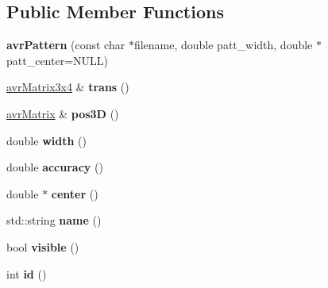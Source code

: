 \subsection*{Public Member Functions}
\begin{DoxyCompactItemize}
\item 
\hypertarget{classavr_pattern_a05f2998048e17c4c0c9aad6f602f11b1}{{\bfseries avr\-Pattern} (const char $\ast$filename, double patt\-\_\-width, double $\ast$patt\-\_\-center=N\-U\-L\-L)}\label{classavr_pattern_a05f2998048e17c4c0c9aad6f602f11b1}

\item 
\hypertarget{classavr_pattern_acbc53b3ae2caa39e890db118045e09f2}{\hyperlink{classavr_matrix3x4}{avr\-Matrix3x4} \& {\bfseries trans} ()}\label{classavr_pattern_acbc53b3ae2caa39e890db118045e09f2}

\item 
\hypertarget{classavr_pattern_affbc11f7ae1f22c9a9fefb855bd6e5b4}{\hyperlink{classavr_matrix}{avr\-Matrix} \& {\bfseries pos3\-D} ()}\label{classavr_pattern_affbc11f7ae1f22c9a9fefb855bd6e5b4}

\item 
\hypertarget{classavr_pattern_acfa3004188b0e188856d99e16b845009}{double {\bfseries width} ()}\label{classavr_pattern_acfa3004188b0e188856d99e16b845009}

\item 
\hypertarget{classavr_pattern_a212a6fc4a9acab9ae06a5fcab82b9c0d}{double {\bfseries accuracy} ()}\label{classavr_pattern_a212a6fc4a9acab9ae06a5fcab82b9c0d}

\item 
\hypertarget{classavr_pattern_aead37a67a2a0ff500b071bd9bafa7c15}{double $\ast$ {\bfseries center} ()}\label{classavr_pattern_aead37a67a2a0ff500b071bd9bafa7c15}

\item 
\hypertarget{classavr_pattern_ab038de2d8ebc3633cd5bbd55d18298a1}{std\-::string {\bfseries name} ()}\label{classavr_pattern_ab038de2d8ebc3633cd5bbd55d18298a1}

\item 
\hypertarget{classavr_pattern_afd677bd736475b0975371795a7bb0209}{bool {\bfseries visible} ()}\label{classavr_pattern_afd677bd736475b0975371795a7bb0209}

\item 
\hypertarget{classavr_pattern_a1d5dc06248a365f6acdef536ae783bf5}{int {\bfseries id} ()}\label{classavr_pattern_a1d5dc06248a365f6acdef536ae783bf5}


\end{DoxyCompactItemize}
